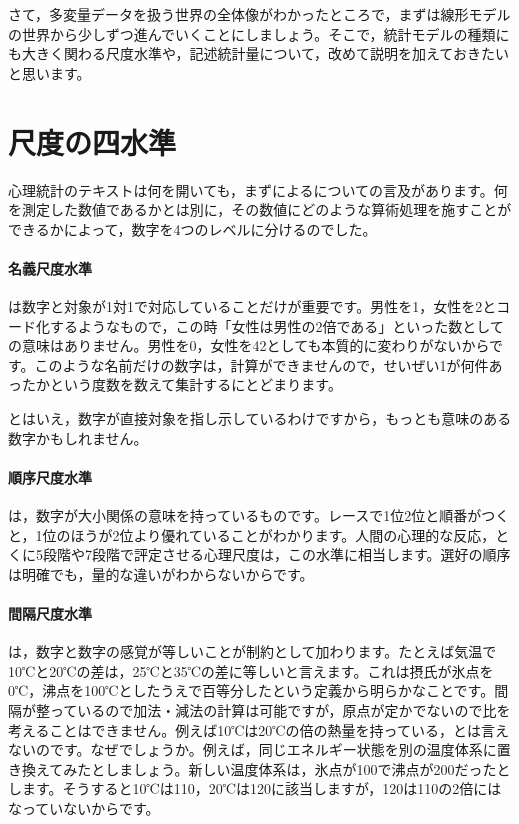 \documentclass{ltjsbook}
\begin{document}
さて，多変量データを扱う世界の全体像がわかったところで，まずは線形モデルの世界から少しずつ進んでいくことにしましょう。そこで，統計モデルの種類にも大きく関わる尺度水準や，記述統計量について，改めて説明を加えておきたいと思います。

\section{尺度の四水準}
心理統計のテキストは何を開いても，まず\citet{stevens1946}によるについての言及があります。何を測定した数値であるかとは別に，その数値にどのような算術処理を施すことができるかによって，数字を4つのレベルに分けるのでした。

\paragraph{名義尺度水準} は数字と対象が1対1で対応していることだけが重要です。男性を1，女性を2とコード化するようなもので，この時「女性は男性の2倍である」といった数としての意味はありません。男性を0，女性を42としても本質的に変わりがないからです。このような名前だけの数字は，計算ができませんので，せいぜい1が何件あったかという度数を数えて集計するにとどまります。

とはいえ，数字が直接対象を指し示しているわけですから，もっとも意味のある数字かもしれません。

\paragraph{順序尺度水準} は，数字が大小関係の意味を持っているものです。レースで1位2位と順番がつくと，1位のほうが2位より優れていることがわかります。人間の心理的な反応，とくに5段階や7段階で評定させる心理尺度は，この水準に相当します。選好の順序は明確でも，量的な違いがわからないからです。

\paragraph{間隔尺度水準} は，数字と数字の感覚が等しいことが制約として加わります。たとえば気温で10℃と20℃の差は，25℃と35℃の差に等しいと言えます。これは摂氏が氷点を0℃，沸点を100℃としたうえで百等分したという定義から明らかなことです。間隔が整っているので加法・減法の計算は可能ですが，原点が定かでないので比を考えることはできません。例えば10℃は20℃の倍の熱量を持っている，とは言えないのです。なぜでしょうか。例えば，同じエネルギー状態を別の温度体系に置き換えてみたとしましょう。新しい温度体系は，氷点が100で沸点が200だったとします。そうすると10℃は110，20℃は120に該当しますが，120は110の2倍にはなっていないからです。
\end{document}
